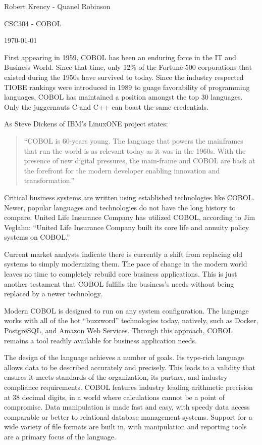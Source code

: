 \documentclass[12pt]{article}
\begin{document}
Robert Krency - Quanel Robinson

CSC304 - COBOL

\today

\vspace{0.5in}

First appearing in 1959, COBOL has been an enduring force in the IT and Business World. 
Since that time, only 12\% of the Fortune 500 corporations that existed during the 1950s have survived to today.
Since the industry respected TIOBE rankings were introduced in 1989 to guage favorability of programming languages, COBOL has maintained a position amongst the top 30 languages.
Only the juggernauts C and C++ can boast the same credentials.

As Steve Dickens of IBM's LinuxONE project states:
\begin{quote}
    ``COBOL  is  60-years  young.   The  language  that  powers  the  mainframes  that  run  the  world  is as relevant today as it was in the 1960s.  With the presence of new digital pressures, the main-frame and COBOL are back at the forefront for the modern developer enabling innovation and transformation.''
\end{quote}

Critical business systems are written using established technologies like COBOL. 
Newer, popular languages and technologies do not have the long history to compare.
United Life Insurance Company has utilized COBOL, according to Jim Veglahn:
``United Life Insurance Company built its core life and annuity policy systems on COBOL.''

Current market analysts indicate there is currently a shift from replacing old systems to simply modernizing them.
The pace of change in the modern world leaves no time to completely rebuild core business applications.
This is just another testament that COBOL fulfills the business's needs without being replaced by a newer technology.

Modern COBOL is designed to run on any system configuration.
The language works with all of the hot ``buzzword'' technologies today, natively, such as Docker, PostgreSQL, and Amazon Web Services.
Through this approach, COBOL remains a tool readily available for business application needs.

The design of the language achieves a number of goals. 
Its type-rich language allows data to be described accurately and precisely.
This leads to a validity that ensures it meets standards of the organization, its partner, and industry compliance requirements.
COBOL features industry leading arithmetic precision at 38 decimal digits, in a world where calculations cannot be a point of compromise.
Data manipulation is made fast and easy, with speedy data access comparable or better to relational database management systems.
Support for a wide variety of file formats are built in, with manipulation and reporting tools are a primary focus of the language.
\end{document}
